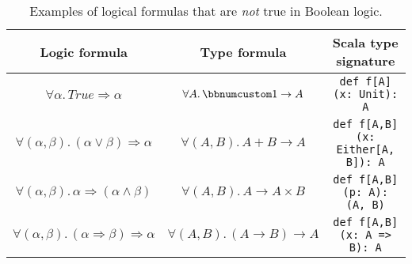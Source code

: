 \begin{table}[h]
\begin{centering}
\begin{tabular}{|c|c|c|}
\hline 
\textbf{\small{}Logic formula} & \textbf{\small{}Type formula} & \textbf{\small{}Scala type signature}\tabularnewline
\hline 
\hline 
{\footnotesize{}$\forall\alpha.\,True\Rightarrow\alpha$} & {\footnotesize{}$\forall A.\,\bbnum 1\rightarrow A$} & \lstinline!def f[A](x: Unit): A!\tabularnewline
\hline 
{\footnotesize{}$\forall(\alpha,\beta).\,(\alpha\vee\beta)\Rightarrow\alpha$} & {\footnotesize{}$\forall(A,B).\,A+B\rightarrow A$} & \lstinline!def f[A,B](x: Either[A, B]): A!\tabularnewline
\hline 
{\footnotesize{}$\forall(\alpha,\beta).\,\alpha\Rightarrow(\alpha\wedge\beta)$} & {\footnotesize{}$\forall(A,B).\,A\rightarrow A\times B$} & \lstinline!def f[A,B](p: A): (A, B)!\tabularnewline
\hline 
{\footnotesize{}$\forall(\alpha,\beta).\,(\alpha\Rightarrow\beta)\Rightarrow\alpha$} & {\footnotesize{}$\forall(A,B).\,(A\rightarrow B)\rightarrow A$} & \lstinline!def f[A,B](x: A => B): A!\tabularnewline
\hline 
\end{tabular}
\par\end{centering}
\caption{Examples of logical formulas that are \emph{not} true in Boolean logic.\label{tab:Logical-formulas-not-Boolean-theorems}}
\end{table}

